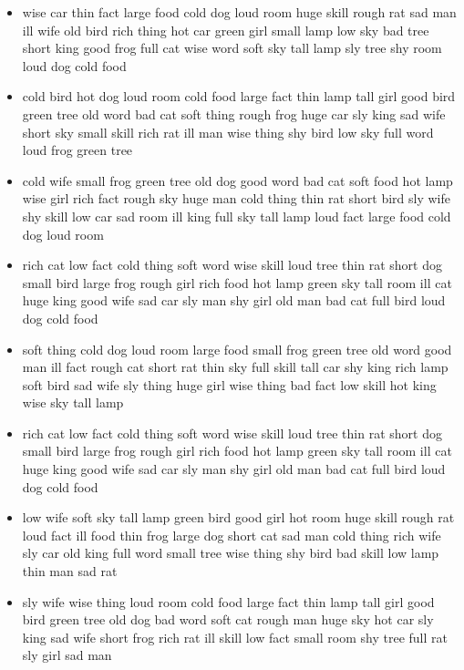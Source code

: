 \documentclass[10pt,letterpaper]{article}
\begin{document}
\begin{itemize}
  \item wise car thin fact large food cold dog loud room huge skill
    rough rat sad man ill wife old bird rich thing hot car green girl
    small lamp low sky bad tree short king good frog full cat wise
    word soft sky tall lamp sly tree shy room loud dog cold food

  \item cold bird hot dog loud room cold food large fact thin lamp
    tall girl good bird green tree old word bad cat soft thing rough
    frog huge car sly king sad wife short sky small skill rich rat ill
    man wise thing shy bird low sky full word loud frog green tree

  \item cold wife small frog green tree old dog good word bad cat soft
    food hot lamp wise girl rich fact rough sky huge man cold thing
    thin rat short bird sly wife shy skill low car sad room ill king
    full sky tall lamp loud fact large food cold dog loud room

  \item rich cat low fact cold thing soft word wise skill loud tree
    thin rat short dog small bird large frog rough girl rich food hot
    lamp green sky tall room ill cat huge king good wife sad car sly
    man shy girl old man bad cat full bird loud dog cold food

  \item soft thing cold dog loud room large food small frog green tree
    old word good man ill fact rough cat short rat thin sky full skill
    tall car shy king rich lamp soft bird sad wife sly thing huge girl
    wise thing bad fact low skill hot king wise sky tall lamp

  \item rich cat low fact cold thing soft word wise skill loud tree
    thin rat short dog small bird large frog rough girl rich food hot
    lamp green sky tall room ill cat huge king good wife sad car sly
    man shy girl old man bad cat full bird loud dog cold food

  \item low wife soft sky tall lamp green bird good girl hot room huge
    skill rough rat loud fact ill food thin frog large dog short cat
    sad man cold thing rich wife sly car old king full word small tree
    wise thing shy bird bad skill low lamp thin man sad rat

  \item sly wife wise thing loud room cold food large fact thin lamp
    tall girl good bird green tree old dog bad word soft cat rough man
    huge sky hot car sly king sad wife short frog rich rat ill skill
    low fact small room shy tree full rat sly girl sad man


\end{itemize}
\end{document}
